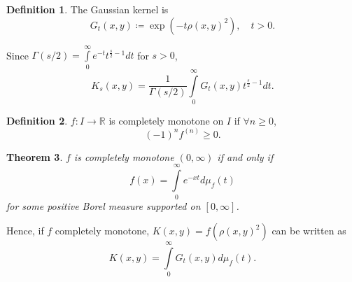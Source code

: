 \documentclass[12pt]{article}
\newtheorem{thm}{Theorem}[section]
\theoremstyle{definition}
\newtheorem{definition}[thm]{Definition}
\begin{document}
\begin{definition}
  The Gaussian kernel is
  \begin{equation}
  \label{eq:5}
  G_t(x,y) \coloneq \exp(-t\rho(x,y)^2), \quad t > 0.
  \end{equation}
\end{definition}

Since \(\Gamma(s/2) = \int\limits_0^{\infty} e^{-t} t^{\frac{s}{2} -1} dt\) for \( s>0 \),
\begin{equation}
\label{eq:6}
K_s(x,y) = \frac{1}{\Gamma(s/2)} \int\limits_0^{\infty} G_t(x,y)t^{\frac{s}{2} -1} dt.
\end{equation}

\begin{definition}
  \( f: I \rightarrow \mathbb{R} \) is completely monotone on \( I \) if \(\forall n \geq 0\),
  \begin{equation}
  \label{eq:7}
  (-1)^n f^{(n)} \geq 0.
  \end{equation}
\end{definition}

\begin{thm}
  \( f \) is completely monotone \( (0, \infty) \) if and only if
  \begin{equation}
  \label{eq:8}
  f(x) = \int\limits_0^{\infty} e^{-xt} d\mu_f(t)
  \end{equation}
  for some positive Borel measure supported on \( [0,\infty] \).
\end{thm}

Hence, if \( f \) completely monotone, \( K(x,y) = f(\rho(x,y)^2) \) can be written as
\begin{equation}
\label{eq:9}
K(x,y) = \int\limits_0^{\infty} G_t(x,y) d\mu_f(t).
\end{equation}
\end{document}
